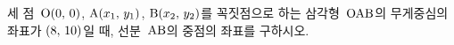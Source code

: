 세 점~$\mathrm{O}(0,\mkern3mu 0)$, $\mathrm{A}(x_1,\mkern3mu y_1)$, $\mathrm{B}(x_2,\mkern3mu y_2)$를 꼭짓점으로 하는 삼각형~$\mathrm{OAB}$의 무게중심의 좌표가 $(8,\mkern3mu 10)$일 때, 선분~$\mathrm{AB}$의 중점의 좌표를 구하시오.
